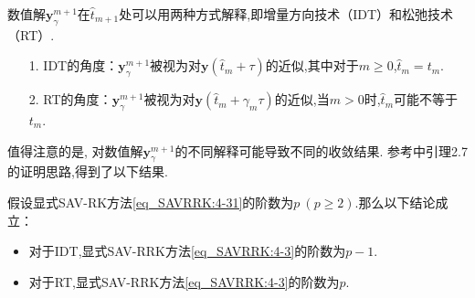 数值解$\bm{y}_\gamma^{m+1}$在$\hat{t}_{m+1}$处可以用两种方式解释\cite{ketchesonRelaxationRungeKutta2019},即增量方向技术（IDT）和松弛技术（RT）.
\begin{itemize}
\item[1.] IDT的角度：$\bm{y}_\gamma^{m+1}$被视为对$\bm{y}\left(\hat{t}_m+\tau\right)$的近似,其中对于$m \geq 0$,$\hat{t}_m=t_m$.
\item[2.] RT的角度：$\bm{y}_\gamma^{m+1}$被视为对$\bm{y}\left(\hat{t}_m+\gamma_m \tau\right)$的近似,当$m>0$时,$\hat{t}_m$可能不等于$t_m$.
\end{itemize}

值得注意的是, 对数值解$\bm{y}_\gamma^{m+1}$的不同解释可能导致不同的收敛结果.
参考\cite{ranochaGeneralRelaxationMethods2020}中引理2.7的证明思路,得到了以下结果.

\begin{theorem}\label{thm_SAVRRK:5_4}
假设显式SAV-RK方法\eqref{eq_SAVRRK:4-31}的阶数为$p~(p \geq 2)$.那么以下结论成立：
\begin{itemize}
\item 对于IDT,显式SAV-RRK方法\eqref{eq_SAVRRK:4-3}的阶数为$p-1$.
\item 对于RT,显式SAV-RRK方法\eqref{eq_SAVRRK:4-3}的阶数为$p$.
\end{itemize}
\end{theorem}


